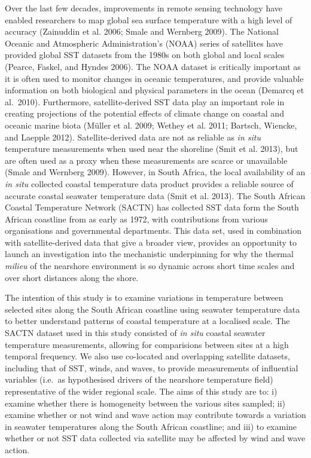 \documentclass[12pt,a4paper,]{article}
\begin{document}
Over the last few decades, improvements in remote sensing technology
have enabled researchers to map global sea surface temperature with a
high level of accuracy (Zainuddin et al. 2006; Smale and Wernberg 2009).
The National Oceanic and Atmospheric Administration's (NOAA) series of
satellites have provided global SST datasets from the 1980s on both
global and local scales (Pearce, Faskel, and Hyndes 2006). The NOAA
dataset is critically important as it is often used to monitor changes
in oceanic temperatures, and provide valuable information on both
biological and physical parameters in the ocean (Demarcq et al.~2010).
Furthermore, satellite-derived SST data play an important role in
creating projections of the potential effects of climate change on
coastal and oceanic marine biota (Müller et al. 2009; Wethey et al.
2011; Bartsch, Wiencke, and Laepple 2012). Satellite-derived data are
not as reliable as \emph{in situ} temperature measurements when used
near the shoreline (Smit et al. 2013), but are often used as a proxy
when these measurements are scarce or unavailable (Smale and Wernberg
2009). However, in South Africa, the local availability of an \emph{in
situ} collected coastal temperature data product provides a reliable
source of accurate coastal seawater temperature data (Smit et al. 2013).
The South African Coastal Temperature Network (SACTN) has collected SST
data form the South African coastline from as early as 1972, with
contributions from various organisations and governmental departments.
This data set, used in combination with satellite-derived data that give
a broader view, provides an opportunity to launch an investigation into
the mechanistic underpinning for why the thermal \emph{milieu} of the
nearshore environment is so dynamic across short time scales and over
short distances along the shore.

The intention of this study is to examine variations in temperature
between selected sites along the South African coastline using seawater
temperature data to better understand patterns of coastal temperature at
a localised scale. The SACTN dataset used in this study consisted of
\emph{in situ} coastal seawater temperature measurements, allowing for
comparisions between sites at a high temporal frequency. We also use
co-located and overlapping satellite datasets, including that of SST,
winds, and waves, to provide measurements of influential variables
(i.e.~as hypothesised drivers of the nearshore temperature field)
representative of the wider regional scale. The aims of this study are
to: i) examine whether there is homogeneity between the various sites
sampled; ii) examine whether or not wind and wave action may contribute
towards a variation in seawater temperatures along the South African
coastline; and iii) to examine whether or not SST data collected via
satellite may be affected by wind and wave action.
\end{document}
